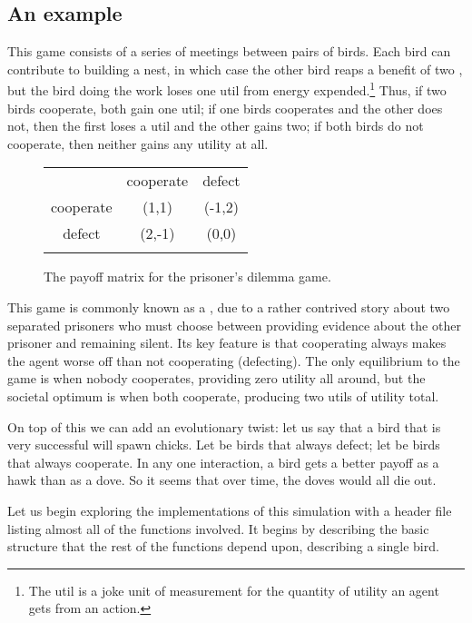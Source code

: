 \subsection{An example}
This game consists of a series of meetings between pairs of birds. Each
bird can contribute to building a nest, in which case the other bird
reaps a benefit of two , but the bird doing the work
loses one util from energy expended.\footnote{The util is a joke unit of measurement for the quantity of utility an agent gets from an action.}
Thus, if two birds cooperate, both gain one util; if one birds
cooperates and the other does not, then the first loses a util and the
other gains two; if both birds do not cooperate, then neither gains any
utility at all.

\begin{figure}[htb]
\hspace {-0.5cm}
\begin{center}
\begin{tabular}{ccc}
 & cooperate & defect \\
\hhline{~--}
cooperate &\multicolumn{1}{|c}{(1,1)} & \multicolumn{1}{c|}{(-1,2)} \\
defect &\multicolumn{1}{|c}{(2,-1)} &  \multicolumn{1}{c|}{(0,0)} \\
\hhline{~--}
\end{tabular}
\end{center}
\caption{The payoff matrix for the prisoner's dilemma game.}
\label{pdfig}
\end{figure}

This game is commonly known as a , due to a
rather contrived story about two separated prisoners who must choose
between providing evidence about the other prisoner and remaining silent.
Its key feature is that cooperating always makes the agent worse off
than not cooperating (defecting). The only equilibrium to the game is
when nobody cooperates, providing zero utility all around, but the
societal optimum is when both cooperate, producing two utils of utility
total.

On top of this we can add an evolutionary twist: let us say that a bird
that is very successful will spawn chicks. Let  be birds
that always defect; let  be birds that always cooperate. In
any one interaction, a bird gets a  better payoff as a hawk than as a dove.
So it seems that over time, the doves would all die out. 

Let us begin exploring the implementations of this simulation with a
header file listing almost all of the functions involved. It begins by
describing the basic structure that the rest of the functions depend
upon, describing a single bird.

